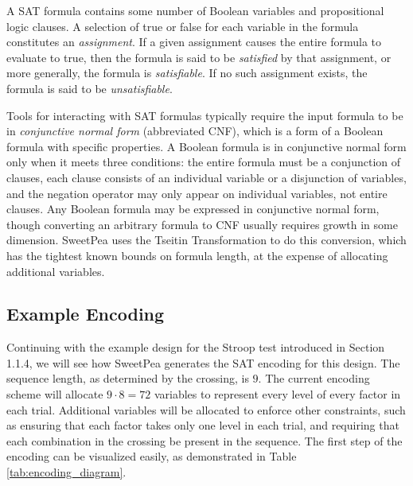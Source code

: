 A SAT formula contains some number of Boolean variables and propositional logic clauses. A selection of true or false for each variable in the formula constitutes an \textit{assignment}. If a given assignment causes the entire formula to evaluate to true, then the formula is said to be \textit{satisfied} by that assignment, or more generally, the formula is \textit{satisfiable}. If no such assignment exists, the formula is said to be \textit{unsatisfiable}.

Tools for interacting with SAT formulas typically require the input formula to be in \textit{conjunctive normal form} (abbreviated CNF), which is a form of a Boolean formula with specific properties. A Boolean formula is in conjunctive normal form only when it meets three conditions: the entire formula must be a conjunction of clauses, each clause consists of an individual variable or a disjunction of variables, and the negation operator may only appear on individual variables, not entire clauses. Any Boolean formula may be expressed in conjunctive normal form, though converting an arbitrary formula to CNF usually requires growth in some dimension. SweetPea uses the Tseitin Transformation \cite{tseitin1983complexity} to do this conversion, which has the tightest known bounds on formula length, at the expense of allocating additional variables.

\subsection{Example Encoding}

Continuing with the example design for the Stroop test introduced in Section 1.1.4, we will see how SweetPea generates the SAT encoding for this design. The sequence length, as determined by the crossing, is $9$. The current encoding scheme will allocate $9 \cdot 8 = 72$ variables to represent every level of every factor in each trial. Additional variables will be allocated to enforce other constraints, such as ensuring that each factor takes only one level in each trial, and requiring that each combination in the crossing be present in the sequence. The first step of the encoding can be visualized easily, as demonstrated in Table \ref{tab:encoding_diagram}.

